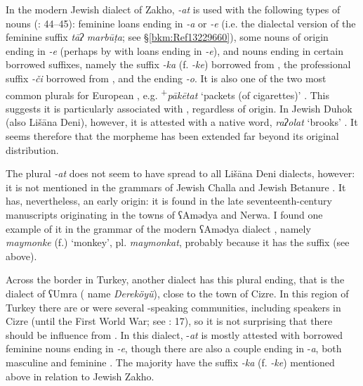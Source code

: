 \documentclass[output=paper]{langsci/langscibook}
\begin{document}
In the modern Jewish dialect of Zakho, \textit{\nobreakdash-at} is used with the following types of nouns (\citealt{Sabar2002}: 44–45): feminine  loans ending in \textit{\nobreakdash-a} or \textit{\nobreakdash-e} (i.e. the dialectal version of the  feminine suffix \textit{tāʔ} \textit{marbūṭa}; see §\ref{bkm:Ref13229660}), some nouns of  origin ending in \textit{\nobreakdash-e} (perhaps by  with  loans ending in \textit{\nobreakdash-e}), and nouns ending in certain borrowed suffixes, namely the  suffix \textit{\nobreakdash-ka} (f. \textit{\nobreakdash-ke}) borrowed from , the professional suffix \textit{{}-či} borrowed from , and the ending \textit{\nobreakdash-o}. It is also one of the two most common plurals for European , e.g. \textsuperscript{+}\textit{pākētat} ‘packets (of cigarettes)’ \citep[57]{Sabar1990}. This suggests it is particularly associated with , regardless of origin. In Jewish Duhok (also Lišāna Deni), however, it is attested with a native  word, \textit{raʔolat} ‘brooks’ \citep[45]{Sabar2002}. It seems therefore that the morpheme has been extended far beyond its original distribution.

The plural \textit{{}-at} does not seem to have spread to all Lišāna Deni dialects, however: it is not mentioned in the grammars of Jewish Challa \citep{Fassberg2010} and Jewish Betanure \citep{Mutzafi2008}. It has, nevertheless, an early origin: it is found in the late seventeenth-century manuscripts originating in the towns of ʕAmədya and Nerwa. I found one example of it in the grammar of the modern ʕAmədya dialect \citep[70]{Greenblatt2011}, namely \textit{maymonke} (f.) ‘monkey’, pl. \textit{maymonkat}, probably because it has the   suffix (see above).

Across the border in Turkey, another  dialect has this plural ending, that is the dialect of ʕUmra ( name \textit{Dereköyü}), close to the town of Cizre. In this region of Turkey there are or were several -speaking communities, including   speakers in Cizre (until the First World War; see \citealt{Jastrow1978}: 17), so it is not surprising that there should be influence from . In this dialect, \nobreakdash-\textit{at} is mostly attested with borrowed feminine nouns ending in \textit{\nobreakdash-e}, though there are also a couple ending in \nobreakdash-\textit{a}, both masculine and feminine \citep[114]{Hobrack2000}. The majority have the   suffix \textit{\nobreakdash-ka} (f. \textit{\nobreakdash-ke}) mentioned above in relation to Jewish Zakho.
\end{document}

